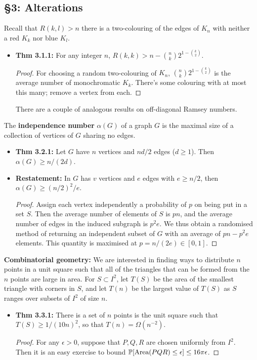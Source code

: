 \documentclass[11pt]{article}
\newenvironment{INT}[1][]{\begin{itemize}\small\item\textbf{#1}}{\end{itemize}}
\newcommand{\moreINT}[1][]{\item\textbf{#1}}
\begin{document}
\begin{chapter3}
\section*{\S3: Alterations}
\begin{itemise}
\item Recall that $R(k,l)>n$ \Iff there is a two-colouring of the edges of $K_n$ with neither a red $K_k$ nor blue $K_l$.
\begin{INT}[Thm 3.1.1:]
For any integer $n$, $R(k,k)>n-{n\choose k}2^{1-{k\choose2}}$.
\begin{proof}
For choosing a random two-colouring of $K_n$, ${n\choose k}2^{1-{k\choose2}}$ is the average number of monochromatic $K_k$. There's some colouring with at most this many; remove a vertex from each.
\end{proof}
There are a couple of analogous results on off-diagonal Ramsey numbers.
\end{INT}
\item The \textbf{independence number} $\alpha(G)$ of a graph $G$ is the maximal size of a collection of vertices of $G$ sharing no edges.
\begin{INT}[Thm 3.2.1:]
Let $G$ have $n$ vertices and $nd/2$ edges ($d\geq1$). Then $\alpha(G)\geq n/(2d)$.
\moreINT[Restatement:] In $G$ has $v$ vertices and $e$ edges with $e\geq n/2$, then $\alpha(G)\geq (n/2)^2/e$.
\begin{proof}
Assign each vertex independently a probability of $p$ on being put in a set $S$. Then the average number of elements of $S$ is $pn$, and the average number of edges in the induced subgraph is $p^2e$. We thus obtain a randomised method of returning an independent subset of $G$ with an average of $pn-p^2e$ elements. This quantity is maximised at $p=n/(2e)\in[0,1]$.
\end{proof}
\end{INT}
\item \textbf{Combinatorial geometry:} We are interested in finding ways to distribute $n$ points in a unit square such that all of the triangles that can be formed from the $n$ points are large in area. For $S\subset I^2$, let $T(S)$ be the area of the smallest triangle with corners in $S$, and let $T(n)$ be the largest value of $T(S)$ as $S$ ranges over subsets of $I^2$ of size $n$.

\begin{INT}[Thm 3.3.1:]
There is a set of $n$ points is the unit square such that $T(S)\geq1/(10n)^2$, so that $T(n)=\Omega(n^{-2})$.
\begin{proof}
For any $\epsilon>0$, suppose that $P,Q,R$ are chosen uniformly from $I^2$. Then it is an easy exercise to bound $\operatorname{\mathbb{P}}[\text{Area}(PQR)\leq\epsilon]\leq16\pi\epsilon$.


\end{proof}
\end{INT}
\end{itemise}
\end{chapter3}
\end{document}
